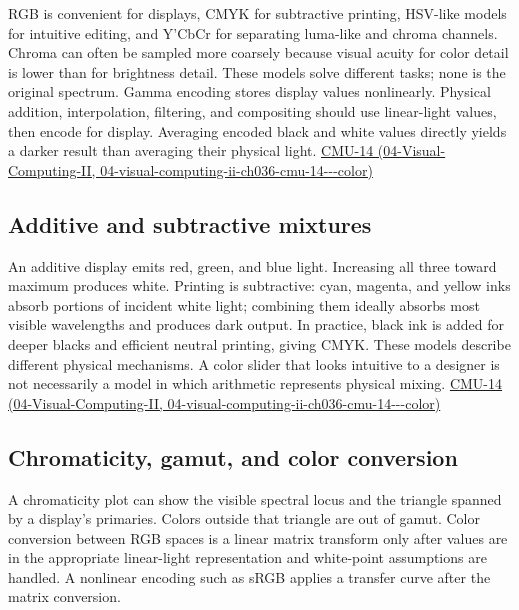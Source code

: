 RGB is convenient for displays, CMYK for subtractive printing, HSV-like models for intuitive editing, and Y'CbCr for separating luma-like and chroma channels. Chroma can often be sampled more coarsely because visual acuity for color detail is lower than for brightness detail. These models solve different tasks; none is the original spectrum. Gamma encoding stores display values nonlinearly. Physical addition, interpolation, filtering, and compositing should use linear-light values, then encode for display. Averaging encoded black and white values directly yields a darker result than averaging their physical light. \href{../04-Visual-Computing-II/main.pdf\#nameddest=04-visual-computing-ii-ch036-cmu-14---color}{CMU-14 (04-Visual-Computing-II, 04-visual-computing-ii-ch036-cmu-14-\/-\/-color)}

\subsection{Additive and subtractive mixtures}\label{03-visual-computing-i-ch004-additive-and-subtractive-mixtures}

An additive display emits red, green, and blue light. Increasing all three toward maximum produces white. Printing is subtractive: cyan, magenta, and yellow inks absorb portions of incident white light; combining them ideally absorbs most visible wavelengths and produces dark output. In practice, black ink is added for deeper blacks and efficient neutral printing, giving CMYK. These models describe different physical mechanisms. A color slider that looks intuitive to a designer is not necessarily a model in which arithmetic represents physical mixing. \href{../04-Visual-Computing-II/main.pdf\#nameddest=04-visual-computing-ii-ch036-cmu-14---color}{CMU-14 (04-Visual-Computing-II, 04-visual-computing-ii-ch036-cmu-14-\/-\/-color)}

\subsection{Chromaticity, gamut, and color conversion}\label{03-visual-computing-i-ch004-chromaticity-gamut-and-color-conversion}

A chromaticity plot can show the visible spectral locus and the triangle spanned by a display's primaries. Colors outside that triangle are out of gamut. Color conversion between RGB spaces is a linear matrix transform only after values are in the appropriate linear-light representation and white-point assumptions are handled. A nonlinear encoding such as sRGB applies a transfer curve after the matrix conversion.

